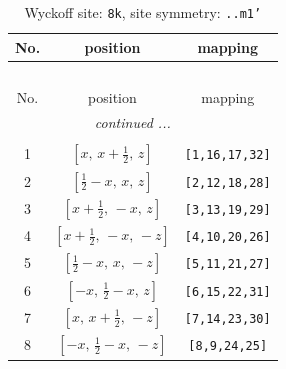 \documentclass[fleqn,8pt]{jsarticle}
\begin{document}
\begin{longtable}{ccc}
\caption{Wyckoff site: {\tt 8k}, site symmetry: {\tt ..m1'}}
 \\
 \hline \hline
No. & position & mapping \\ \hline \endfirsthead

\multicolumn{2}{l}{\tablename\ \thetable{}} \\
 \hline \hline
No. & position & mapping \\ \hline \endhead

 \hline \hline
\multicolumn{2}{r}{\footnotesize\it continued ...} \\ \endfoot

 \hline \hline
\multicolumn{2}{r}{} \\ \endlastfoot

1 & $\left[ x,\, x + \frac{1}{2},\, z \right]$ & {\tt [1,16,17,32]} \\ \hline
2 & $\left[ \frac{1}{2} - x,\, x,\, z \right]$ & {\tt [2,12,18,28]} \\ \hline
3 & $\left[ x + \frac{1}{2},\, - x,\, z \right]$ & {\tt [3,13,19,29]} \\ \hline
4 & $\left[ x + \frac{1}{2},\, - x,\, - z \right]$ & {\tt [4,10,20,26]} \\ \hline
5 & $\left[ \frac{1}{2} - x,\, x,\, - z \right]$ & {\tt [5,11,21,27]} \\ \hline
6 & $\left[ - x,\, \frac{1}{2} - x,\, z \right]$ & {\tt [6,15,22,31]} \\ \hline
7 & $\left[ x,\, x + \frac{1}{2},\, - z \right]$ & {\tt [7,14,23,30]} \\ \hline
8 & $\left[ - x,\, \frac{1}{2} - x,\, - z \right]$ & {\tt [8,9,24,25]} \\
\end{longtable}
\renewcommand{\arraystretch}{1.2}
\end{document}

